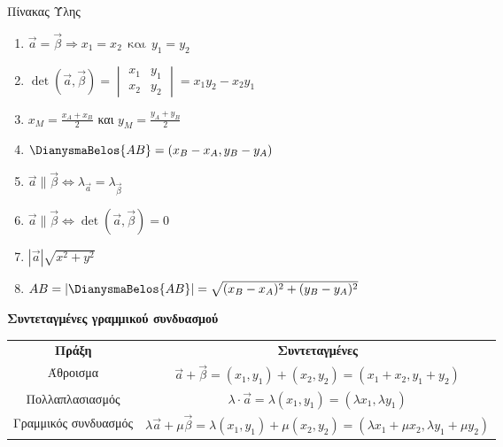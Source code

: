 \documentclass[internet]{frontisthrio}
\begin{document}
\begin{mybox}[mysubtitle]{Πίνακας Ύλης}
\begin{multicols}{2}
\begin{enumerate}[itemsep=0mm,leftmargin=5mm]
\item $\vec{a}=\vec{\beta}\Rightarrow x_1=x_2\ \ \textrm{και}\ \ y_1=y_2$
\item $\det(\vec{a},\vec{\beta})=\begin{vmatrix}
 x_1 & y_1 \\
x_2 & y_2
\end{vmatrix}=x_1y_2-x_2y_1$
\item $x_M=\frac{x_A+x_B}{2}$ και $y_M=\frac{y_A+y_B}{2}$
\item $\DianysmaBelos{AB}=(x_B-x_A,y_B-y_A)$
\item $\vec{a}\parallel\vec{\beta}\Leftrightarrow \lambda_{\vec{a}}=\lambda_{\vec{\beta}}$
\item $\vec{a}\parallel\vec{\beta}\Leftrightarrow \det(\vec{a},\vec{\beta})=0$
\item $|\vec{a}|\sqrt{x^2+y^2}$
\item $AB=|\DianysmaBelos{AB}|=\sqrt{(x_B-x_A)^2+(y_B-y_A)^2}$
\end{enumerate}
\end{multicols}
\begin{center}
\textbf{Συντεταγμένες γραμμικού συνδυασμού}\\
\begin{tabular}{cc}
\hline \rule[-2ex]{0pt}{5.5ex} \textbf{Πράξη} & \textbf{Συντεταγμένες} \\ 
\hhline{==} \rule[-2ex]{0pt}{5.5ex} Άθροισμα & $ \vec{a}+\vec{\beta}=(x_1,y_1)+(x_2,y_2)=(x_1+x_2,y_1+y_2) $ \\ 
 \rule[-2ex]{0pt}{5.5ex} Πολλαπλασιασμός & $ \lambda\cdot\vec{a}=\lambda(x_1,y_1)=(\lambda x_1,\lambda y_1) $ \\ 
 \rule[-2ex]{0pt}{5.5ex} Γραμμικός συνδυασμός & $ \lambda\vec{a}+\mu\vec{\beta}=\lambda(x_1,y_1)+\mu(x_2,y_2)=(\lambda x_1+\mu x_2,\lambda y_1+\mu y_2) $ \\ 
\hline 
\end{tabular}
\end{center} 
\end{mybox}
\newpage
\end{document}
